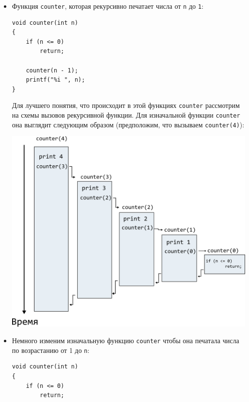 \documentclass{article}
\begin{document}
\begin{itemize}
\item Функция \texttt{counter}, которая рекурсивно печатает числа от \texttt{n} до \texttt{1}: 
\begin{lstlisting}
void counter(int n) 
{
    if (n <= 0)
        return;
        
    counter(n - 1);
    printf("%i ", n);
}
\end{lstlisting}
Для лучшего понятия, что происходит в этой функциях \texttt{counter} рассмотрим на схемы вызовов рекурсивной функции. Для изначальной функции \texttt{counter} она выглядит следующим образом (предположим, что вызываем \texttt{counter(4)}):


\begin{center}
\includegraphics[scale=0.67]{../images/counterini.png}
\end{center}


\newpage

\item Немного изменим изначальную функцию \texttt{counter} чтобы она печатала числа по возрастанию от 1 до \texttt{n}:
\begin{lstlisting}
void counter(int n) 
{
    if (n <= 0)
        return;
        

\end{lstlisting}
\end{itemize}
\end{document}
